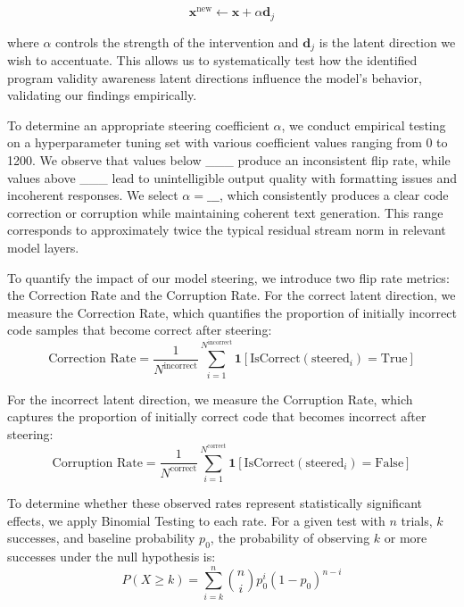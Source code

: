 \begin{equation}
\mathbf{x}^{\text{new}} \leftarrow \mathbf{x} + \alpha\mathbf{d}_j
\end{equation}

where $\alpha$ controls the strength of the intervention and $\mathbf{d}_j$ is the latent direction we wish to accentuate. This allows us to systematically test how the identified program validity awareness latent directions influence the model's behavior, validating our findings empirically.

To determine an appropriate steering coefficient $\alpha$, we conduct empirical testing on a hyperparameter tuning set with various coefficient values ranging from 0 to 1200. We observe that values below \_\_\_ produce an inconsistent flip rate, while values above \_\_\_ lead to unintelligible output quality with formatting issues and incoherent responses. We select $\alpha = \_\_\_$, which consistently produces a clear code correction or corruption while maintaining coherent text generation. This range corresponds to approximately twice the typical residual stream norm in relevant model layers.

To quantify the impact of our model steering, we introduce two flip rate metrics: the Correction Rate and the Corruption Rate. For the correct latent direction, we measure the Correction Rate, which quantifies the proportion of initially incorrect code samples that become correct after steering:
\begin{equation}
\text{Correction Rate} = \frac{1}{N^{\text{incorrect}}} \sum_{i=1}^{N^{\text{incorrect}}} \mathbf{1}[\text{IsCorrect}(\text{steered}_i)= \text{True}]
\end{equation}

For the incorrect latent direction, we measure the Corruption Rate, which captures the proportion of initially correct code that becomes incorrect after steering:
\begin{equation}
\text{Corruption Rate} = \frac{1}{N^{\text{correct}}} \sum_{i=1}^{N^{\text{correct}}} \mathbf{1}[\text{IsCorrect}(\text{steered}_i)= \text{False}]
\end{equation}

To determine whether these observed rates represent statistically significant effects, we apply Binomial Testing to each rate. For a given test with $n$ trials, $k$ successes, and baseline probability $p_0$, the probability of observing $k$ or more successes under the null hypothesis is:
\begin{equation}
P(X \geq k) = \sum_{i=k}^{n} \binom{n}{i} p_0^i (1-p_0)^{n-i}
\end{equation}

